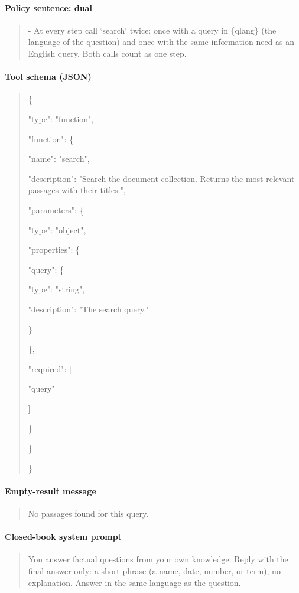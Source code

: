 \paragraph{Policy sentence: dual}
\begin{quote}\small\ttfamily\raggedright
- At every step call `search` twice: once with a query in \{qlang\} (the language of the question) and once with the same information need as an English query. Both calls count as one step.
\end{quote}

\paragraph{Tool schema (JSON)}
\begin{quote}\small\ttfamily\raggedright
\{ \par  "type": "function", \par  "function": \{ \par   "name": "search", \par   "description": "Search the document collection. Returns the most relevant passages with their titles.", \par   "parameters": \{ \par    "type": "object", \par    "properties": \{ \par     "query": \{ \par      "type": "string", \par      "description": "The search query." \par     \} \par    \}, \par    "required": [ \par     "query" \par    ] \par   \} \par  \} \par \}
\end{quote}

\paragraph{Empty-result message}
\begin{quote}\small\ttfamily\raggedright
No passages found for this query.
\end{quote}

\paragraph{Closed-book system prompt}
\begin{quote}\small\ttfamily\raggedright
You answer factual questions from your own knowledge. Reply with the final answer only: a short phrase (a name, date, number, or term), no explanation. Answer in the same language as the question.
\end{quote}

